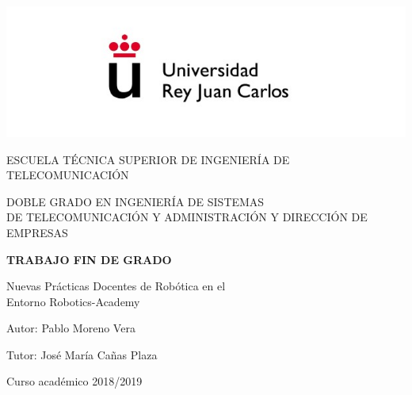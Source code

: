 \begin{titlepage}
	\begin{center}
		\vspace*{3mm}
		\begin{center}
			\includegraphics[width=0.8\linewidth]{figures/logo.jpg}
		\end{center}
		\vspace{6.5mm}
		
		\fontsize{15.5}{14}\selectfont ESCUELA TÉCNICA SUPERIOR DE INGENIERÍA DE TELECOMUNICACIÓN
		\vspace{13mm}
		
		\fontsize{14}{14}\selectfont DOBLE GRADO EN INGENIERÍA DE SISTEMAS \\ DE TELECOMUNICACIÓN Y ADMINISTRACIÓN Y DIRECCIÓN DE EMPRESAS
		
		\vspace{55pt}
		
		\fontsize{15.7}{14}\selectfont \textbf{TRABAJO FIN DE GRADO} 
		
		\vspace{15mm}
		\begin{huge}
			Nuevas Prácticas Docentes de Robótica en el \\ \vspace{0.4cm} Entorno Robotics-Academy
		\end{huge}
		
		\vspace{15mm}
		
		\begin{large}
			Autor: Pablo Moreno Vera
			
			Tutor: José María Cañas Plaza
			
			\vspace{10mm}
		\end{large}
		\begin{normalsize}
			Curso académico 2018/2019		
		\end{normalsize}
		\vspace{10mm}
		
	\end{center}
	
\end{titlepage}